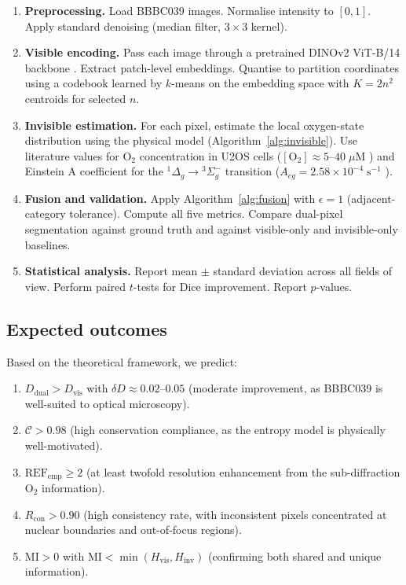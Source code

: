 \documentclass[11pt,twocolumn,a4paper]{article}
\begin{document}
\begin{enumerate}
\item \textbf{Preprocessing.} Load BBBC039 images. Normalise intensity to $[0,1]$. Apply standard denoising (median filter, $3 \times 3$ kernel).

\item \textbf{Visible encoding.} Pass each image through a pretrained DINOv2 ViT-B/14 backbone \citep{Oquab2024,Dosovitskiy2021}. Extract patch-level embeddings. Quantise to partition coordinates using a codebook learned by $k$-means on the embedding space with $K = 2n^2$ centroids for selected $n$.

\item \textbf{Invisible estimation.} For each pixel, estimate the local oxygen-state distribution using the physical model (Algorithm~\ref{alg:invisible}). Use literature values for O$_2$ concentration in U2OS cells ($[\mathrm{O}_2] \approx 5$--$40\;\mu$M \citep{Carreau2011}) and Einstein A coefficient for the ${}^1\Delta_g \to {}^3\Sigma_g^-$ transition ($A_{eg} = 2.58 \times 10^{-4}\;\mathrm{s}^{-1}$ \citep{Schweitzer2003}).

\item \textbf{Fusion and validation.} Apply Algorithm~\ref{alg:fusion} with $\epsilon = 1$ (adjacent-category tolerance). Compute all five metrics. Compare dual-pixel segmentation against ground truth and against visible-only and invisible-only baselines.

\item \textbf{Statistical analysis.} Report mean $\pm$ standard deviation across all fields of view. Perform paired $t$-tests for Dice improvement. Report $p$-values.
\end{enumerate}

\subsection{Expected outcomes}

Based on the theoretical framework, we predict:
\begin{enumerate}
\item $D_{\mathrm{dual}} > D_{\mathrm{vis}}$ with $\delta D \approx 0.02$--$0.05$ (moderate improvement, as BBBC039 is well-suited to optical microscopy).
\item $\mathcal{C} > 0.98$ (high conservation compliance, as the entropy model is physically well-motivated).
\item $\mathrm{REF}_{\mathrm{emp}} \geq 2$ (at least twofold resolution enhancement from the sub-diffraction O$_2$ information).
\item $R_{\mathrm{con}} > 0.90$ (high consistency rate, with inconsistent pixels concentrated at nuclear boundaries and out-of-focus regions).
\item $\mathrm{MI} > 0$ with $\mathrm{MI} < \min(H_{\mathrm{vis}}, H_{\mathrm{inv}})$ (confirming both shared and unique information).
\end{enumerate}
\end{document}
